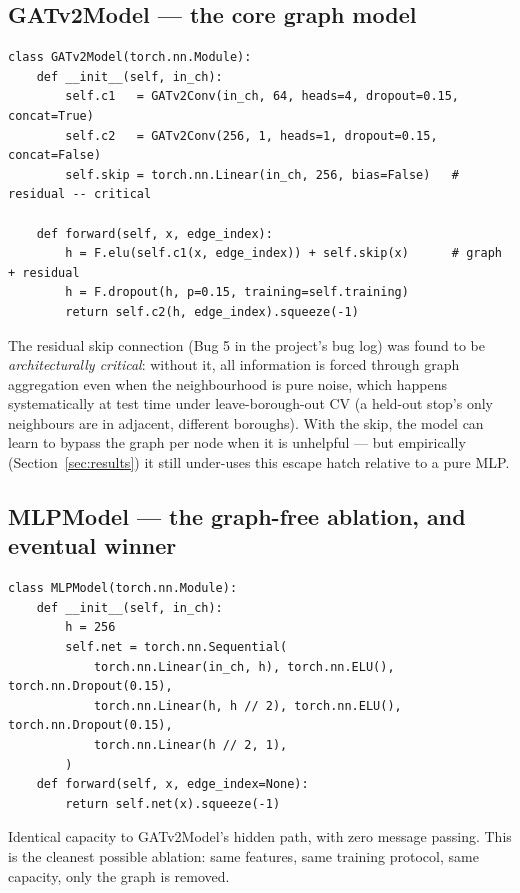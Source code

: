 \documentclass[11pt]{article}
\let\oldsubsection\subsection
\renewcommand{\subsection}[1]{\oldsubsection{\color{sectcolor}#1}}
\begin{document}
\subsection{GATv2Model --- the core graph model}
{\small\begin{verbatim}
class GATv2Model(torch.nn.Module):
    def __init__(self, in_ch):
        self.c1   = GATv2Conv(in_ch, 64, heads=4, dropout=0.15, concat=True)
        self.c2   = GATv2Conv(256, 1, heads=1, dropout=0.15, concat=False)
        self.skip = torch.nn.Linear(in_ch, 256, bias=False)   # residual -- critical

    def forward(self, x, edge_index):
        h = F.elu(self.c1(x, edge_index)) + self.skip(x)      # graph + residual
        h = F.dropout(h, p=0.15, training=self.training)
        return self.c2(h, edge_index).squeeze(-1)
\end{verbatim}}
The residual skip connection (Bug 5 in the project's bug log) was found to be
\emph{architecturally critical}: without it, all information is forced through graph
aggregation even when the neighbourhood is pure noise, which happens systematically at test
time under leave-borough-out CV (a held-out stop's only neighbours are in adjacent, different
boroughs). With the skip, the model can learn to bypass the graph per node when it is
unhelpful --- but empirically (Section~\ref{sec:results}) it still under-uses this escape
hatch relative to a pure MLP.

\subsection{MLPModel --- the graph-free ablation, and eventual winner}
{\small\begin{verbatim}
class MLPModel(torch.nn.Module):
    def __init__(self, in_ch):
        h = 256
        self.net = torch.nn.Sequential(
            torch.nn.Linear(in_ch, h), torch.nn.ELU(), torch.nn.Dropout(0.15),
            torch.nn.Linear(h, h // 2), torch.nn.ELU(), torch.nn.Dropout(0.15),
            torch.nn.Linear(h // 2, 1),
        )
    def forward(self, x, edge_index=None):
        return self.net(x).squeeze(-1)
\end{verbatim}}
Identical capacity to GATv2Model's hidden path, with zero message passing. This is the
cleanest possible ablation: same features, same training protocol, same capacity, only the
graph is removed.
\end{document}
